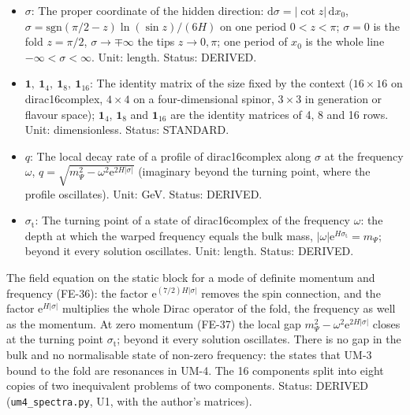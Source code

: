 \documentclass[
  10pt,
]{article}
\begin{document}
\begin{itemize}
  in the bulk. Unit: GeV (1/length). Value: \(H > 2534\) GeV, about 2.5
  TeV (from the invisible width of the Z boson). Status: AUTHOR.
\item
  \(\sigma\): The proper coordinate of the hidden direction:
  \(\mathrm{d}\sigma = \lvert\cot z\rvert\,\mathrm{d}x_0\),
  \(\sigma = \mathrm{sgn}(\pi/2 - z)\ln(\sin z)/(6H)\) on one period
  \(0 < z < \pi\); \(\sigma = 0\) is the fold \(z = \pi/2\),
  \(\sigma \to \mp\infty\) the tips \(z \to 0, \pi\); one period of
  \(x_0\) is the whole line \(-\infty < \sigma < \infty\). Unit: length.
  Status: DERIVED.
\item
  \(\mathbf{1},\ \mathbf{1}_4,\ \mathbf{1}_8,\ \mathbf{1}_{16}\): The
  identity matrix of the size fixed by the context (\(16 \times 16\) on
  dirac16complex, \(4 \times 4\) on a four-dimensional spinor,
  \(3 \times 3\) in generation or flavour space); \(\mathbf{1}_4\),
  \(\mathbf{1}_8\) and \(\mathbf{1}_{16}\) are the identity matrices of
  4, 8 and 16 rows. Unit: dimensionless. Status: STANDARD.
\item
  \(q\): The local decay rate of a profile of dirac16complex along
  \(\sigma\) at the frequency \(\omega\),
  \(q = \sqrt{m_\Psi^2 - \omega^2\mathrm{e}^{2H\lvert\sigma\rvert}}\)
  (imaginary beyond the turning point, where the profile oscillates).
  Unit: GeV. Status: DERIVED.
\item
  \(\sigma_{\mathrm{t}}\): The turning point of a state of
  dirac16complex of the frequency \(\omega\): the depth at which the
  warped frequency equals the bulk mass,
  \(\lvert\omega\rvert\mathrm{e}^{H\sigma_{\mathrm{t}}} = m_\Psi\);
  beyond it every solution oscillates. Unit: length. Status: DERIVED.
\end{itemize}

The field equation on the static block for a mode of definite momentum
and frequency (FE-36): the factor
\(\mathrm{e}^{(7/2)H\lvert\sigma\rvert}\) removes the spin connection,
and the factor \(\mathrm{e}^{H\lvert\sigma\rvert}\) multiplies the whole
Dirac operator of the fold, the frequency as well as the momentum. At
zero momentum (FE-37) the local gap
\(m_\Psi^2 - \omega^2\mathrm{e}^{2H\lvert\sigma\rvert}\) closes at the
turning point \(\sigma_{\mathrm{t}}\); beyond it every solution
oscillates. There is no gap in the bulk and no normalisable state of
non-zero frequency: the states that UM-3 bound to the fold are
resonances in UM-4. The 16 components split into eight copies of two
inequivalent problems of two components. Status: DERIVED
(\texttt{um4\_spectra.py}, U1, with the author's matrices).
\end{document}
